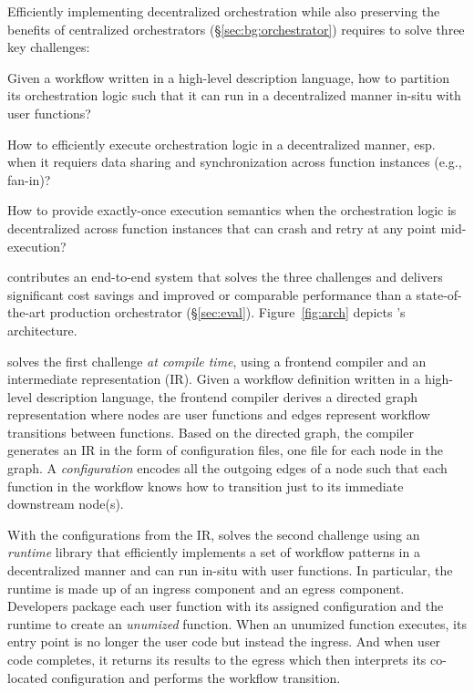 Efficiently implementing decentralized orchestration while also preserving the
benefits of centralized orchestrators (\S\ref{sec:bg:orchestrator}) requires
\name{} to solve three key challenges:

\squishenum
	\item Given a workflow written in a high-level description language, how
	to partition its orchestration logic such that it can run in a
	decentralized manner in-situ with user functions?

	\item How to efficiently execute orchestration logic in a
	decentralized manner, esp. when it requiers data sharing and
	synchronization across function instances (e.g., fan-in)?

	\item How to provide exactly-once execution semantics when the
	orchestration logic is decentralized across function instances that can
	crash and retry at any point mid-execution?
\squishenumend

\name{} contributes an end-to-end system that solves the three challenges and
delivers significant cost savings and improved or comparable performance than
a state-of-the-art production orchestrator (\S\ref{sec:eval}).
Figure~\ref{fig:arch} depicts \name{}'s architecture. 

\name{} solves the first challenge \emph{at compile time}, using a frontend
compiler and an intermediate representation (IR). Given a workflow definition
written in a high-level description language, the frontend compiler derives a
directed graph representation where nodes are user functions and edges
represent workflow transitions between functions. Based on the directed graph,
the compiler generates an IR in the form of configuration files, one file for
each node in the graph. A \textit{\name{} configuration} encodes all the outgoing edges
of a node such that each function in the workflow knows how to transition just
to its immediate downstream node(s).

With the \name{} configurations from the IR, \name{} solves the second challenge using
an \textit{\name{} runtime} library that efficiently implements a set of workflow patterns in a
decentralized manner and can run in-situ with user functions. In particular,
the \name{} runtime is made up of an ingress component and an egress component.
Developers package each user function with its assigned \name{} configuration
and the \name{} runtime to create an \emph{unumized} function. When an
unumized function executes, its entry point is no longer the user code but
instead the \name{} ingress. And when user code completes, it returns its
results to the \name{} egress which then interprets its co-located \name{}
configuration and performs the workflow transition.


